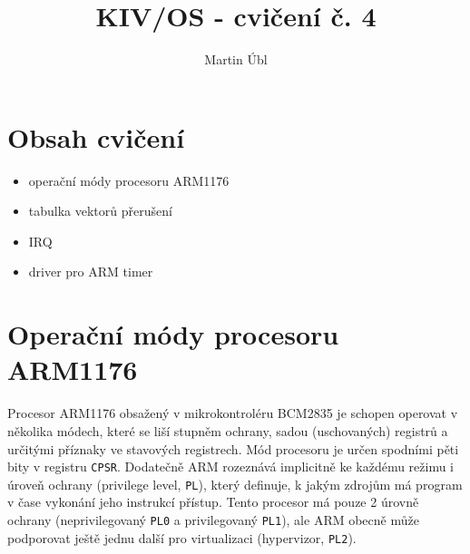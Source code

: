 \documentclass{article}
\author{Martin Úbl}
\title{KIV/OS - cvičení č. 4}
\begin{document}
\maketitle



\section{Obsah cvičení}

\begin{itemize}
	\item operační módy procesoru ARM1176
	\item tabulka vektorů přerušení
	\item IRQ
	\item driver pro ARM timer
\end{itemize}

\section{Operační módy procesoru ARM1176}

Procesor ARM1176 obsažený v mikrokontroléru BCM2835 je schopen operovat v několika módech, které se liší stupněm ochrany, sadou (uschovaných) registrů a určitými příznaky ve stavových registrech. Mód procesoru je určen spodními pěti bity v registru \texttt{CPSR}. Dodatečně ARM rozeznává implicitně ke každému režimu i úroveň ochrany (privilege level, \texttt{PL}), který definuje, k jakým zdrojům má program v čase vykonání jeho instrukcí přístup. Tento procesor má pouze 2 úrovně ochrany (neprivilegovaný \texttt{PL0} a privilegovaný \texttt{PL1}), ale ARM obecně může podporovat ještě jednu další pro virtualizaci (hypervizor, \texttt{PL2}).
\end{document}
